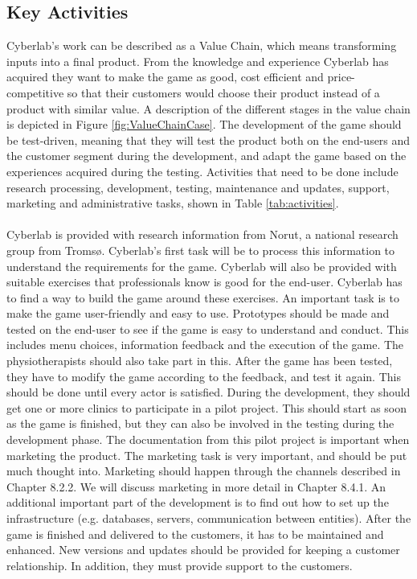 \subsection{Key Activities}
Cyberlab's work can be described as a Value Chain, which means transforming inputs into a final product. From the knowledge and experience Cyberlab has acquired they want to make the game as good, cost efficient and price-competitive so that their customers would choose their product instead of a product with similar value. A description of the different stages in the value chain is depicted in Figure \ref{fig:ValueChainCase}. The development of the game should be test-driven, meaning that they will test the product both on the end-users and the customer segment during the development, and adapt the game based on the experiences acquired during the testing. Activities that need to be done include research processing, development, testing, maintenance and updates, support, marketing and administrative tasks, shown in Table \ref{tab:activities}. \\ \\
Cyberlab is provided with research information from Norut, a national research group from Tromsø. Cyberlab's first task will be to process this information to understand the requirements for the game. Cyberlab will also be provided with suitable exercises that professionals know is good for the end-user. Cyberlab has to find a way to build the game around these exercises. An important task is to make the game user-friendly and easy to use. Prototypes should be made and tested on the end-user to see if the game is easy to understand and conduct. This includes menu choices, information feedback and the execution of the game. The physiotherapists should also take part in this. After the game has been tested, they have to modify the game according to the feedback, and test it again. This should be done until every actor is satisfied. During the development, they should get one or more clinics to participate in a pilot project. This should start as soon as the game is finished, but they can also be involved in the testing during the development phase. The documentation from this pilot project is important when marketing the product. The marketing task is very important, and should be put much thought into. Marketing should happen through the channels described in Chapter 8.2.2.  We will discuss marketing in more detail in Chapter 8.4.1. An additional important part of the development is to find out how to set up the infrastructure (e.g. databases, servers, communication between entities). After the game is finished and delivered to the customers, it has to be maintained and enhanced. New versions and updates should be provided for keeping a customer relationship. In addition, they must provide support to the customers.  

